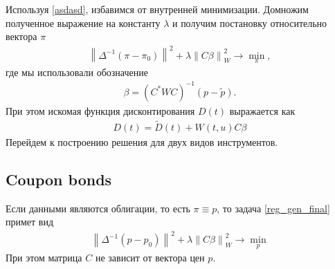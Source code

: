 \documentclass[10pt]{article}
\theoremstyle{definition}
\theoremstyle{remark}
\theoremstyle{plain}
\newcommand{\wt}{\widetilde}
\begin{document}
Используя \eqref{asdasd}, избавимся от внутренней минимизации. Домножим полученное выражение на константу $\lambda$ и получим постановку относительно вектора $\pi$
\begin{align}
\left\| \Delta^{-1}\left(\pi - \pi_0\right)\right\|^2 +
\lambda
\left\|C\beta\right\|^2_W 
\rightarrow \min\limits_\pi , \label{reg_gen_final}
\end{align}
где мы использовали обозначение
\begin{align}
\beta = \left(C^*WC\right)^{-1}(p-\tilde{p}). \label{beta_def}
\end{align}
При этом искомая функция дисконтирования $D(t)$ выражается как
\begin{align}
D(t) = \wt{D}(t) + W(t,u)C\beta
\end{align}
Перейдем к построению решения для двух видов инструментов.



\subsection{Coupon bonds}

Если данными являются облигации, то есть $\pi \equiv p$, то задача \eqref{reg_gen_final} примет вид
\begin{align}
\left\| \Delta^{-1}\left(p - p_0\right)\right\|^2 +
\lambda
\left\|C\beta\right\|^2_W 
\rightarrow \min\limits_p \label{reg_bond_min_p}
\end{align}
При этом матрица $C$ не зависит от вектора цен $p$.
\end{document}
